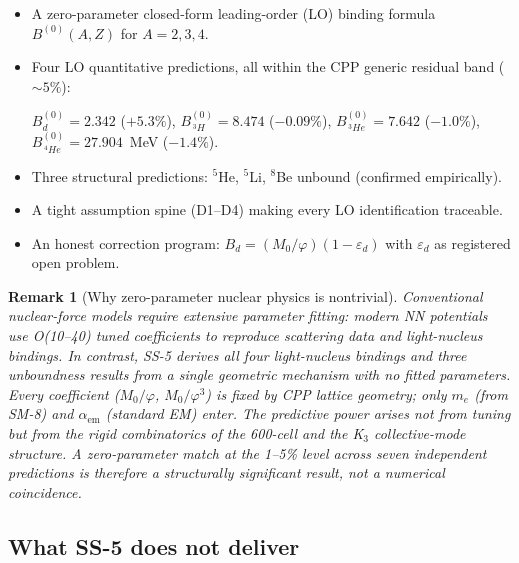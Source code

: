 \documentclass[11pt,letterpaper]{article}
\newtheorem{remark}[theorem]{Remark}
\newcommand{\phig}{\varphi}
\newcommand{\Mzero}{M_0}
\newcommand{\Bd}{B_{d}}
\newcommand{\Bdlo}{B_{d}^{(0)}}
\newcommand{\epsd}{\varepsilon_{d}}
\begin{document}
\begin{itemize}
\item A zero-parameter closed-form leading-order (LO) binding formula $B^{(0)}(A, Z)$ for $A = 2, 3, 4$.
\item Four LO quantitative predictions, all within the CPP generic residual band ($\sim 5\%$):
  \begin{center}
  $\Bdlo = 2.342$ ($+5.3\%$), $B^{(0)}_{\,^3\!H} = 8.474$ ($-0.09\%$), $B^{(0)}_{\,^3\!He} = 7.642$ ($-1.0\%$), $B^{(0)}_{\,^4\!He} = 27.904$~MeV ($-1.4\%$).
  \end{center}
\item Three structural predictions: ${}^5$He, ${}^5$Li, ${}^8$Be unbound (confirmed empirically).
\item A tight assumption spine (D1--D4) making every LO identification traceable.
\item An honest correction program: $\Bd = (\Mzero/\phig)(1 - \epsd)$ with $\epsd$ as registered open problem.
\end{itemize}

\begin{remark}[Why zero-parameter nuclear physics is nontrivial]
Conventional nuclear-force models require extensive parameter fitting: modern NN potentials use O(10--40) tuned coefficients to reproduce scattering data and light-nucleus bindings. In contrast, SS-5 derives all four light-nucleus bindings and three unboundness results from a single geometric mechanism with \emph{no fitted parameters}. Every coefficient ($\Mzero/\phig$, $\Mzero/\phig^3$) is fixed by CPP lattice geometry; only $m_e$ (from SM-8) and $\alpha_{\mathrm{em}}$ (standard EM) enter. The predictive power arises not from tuning but from the rigid combinatorics of the 600-cell and the K$_3$ collective-mode structure. A zero-parameter match at the 1--5\% level across seven independent predictions is therefore a structurally significant result, not a numerical coincidence.
\end{remark}

\subsection{What SS-5 does not deliver}
\end{document}
